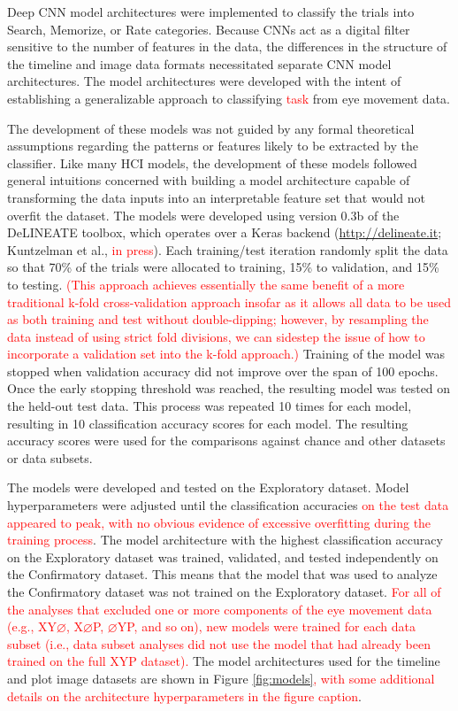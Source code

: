 \documentclass[
  english,
  man, donotrepeattitle,floatsintext]{apa6}
\begin{document}
Deep CNN model architectures were implemented to classify the trials into Search, Memorize, or Rate categories. Because CNNs act as a digital filter sensitive to the number of features in the data, the differences in the structure of the timeline and image data formats necessitated separate CNN model architectures. The model architectures were developed with the intent of establishing a generalizable approach to classifying \textcolor{red}{task} from eye movement data.

The development of these models was not guided by any formal theoretical assumptions regarding the patterns or features likely to be extracted by the classifier. Like many HCI models, the development of these models followed general intuitions concerned with building a model architecture capable of transforming the data inputs into an interpretable feature set that would not overfit the dataset. The models were developed using version 0.3b of the DeLINEATE toolbox, which operates over a Keras backend (\url{http://delineate.it}; Kuntzelman et al., \textcolor{red}{in press}). Each training/test iteration randomly split the data so that 70\% of the trials were allocated to training, 15\% to validation, and 15\% to testing. \textcolor{red}{(This approach achieves essentially the same benefit of a more traditional k-fold cross-validation approach insofar as it allows all data to be used as both training and test without double-dipping; however, by resampling the data instead of using strict fold divisions, we can sidestep the issue of how to incorporate a validation set into the k-fold approach.)} Training of the model was stopped when validation accuracy did not improve over the span of 100 epochs. Once the early stopping threshold was reached, the resulting model was tested on the held-out test data. This process was repeated 10 times for each model, resulting in 10 classification accuracy scores for each model. The resulting accuracy scores were used for the comparisons against chance and other datasets or data subsets.

The models were developed and tested on the Exploratory dataset. Model hyperparameters were adjusted until the classification accuracies \textcolor{red}{on the test data appeared to peak, with no obvious evidence of excessive overfitting during the training process}. The model architecture with the highest classification accuracy on the Exploratory dataset was trained, validated, and tested independently on the Confirmatory dataset. This means that the model that was used to analyze the Confirmatory dataset was not trained on the Exploratory dataset. \textcolor{red}{For all of the analyses that excluded one or more components of the eye movement data (e.g., XY$\varnothing$, X$\varnothing$P, $\varnothing$YP, and so on), new models were trained for each data subset (i.e., data subset analyses did not use the model that had already been trained on the full XYP dataset).} The model architectures used for the timeline and plot image datasets are shown in Figure \ref{fig:models}\textcolor{red}{, with some additional details on the architecture hyperparameters in the figure caption}.
\end{document}
